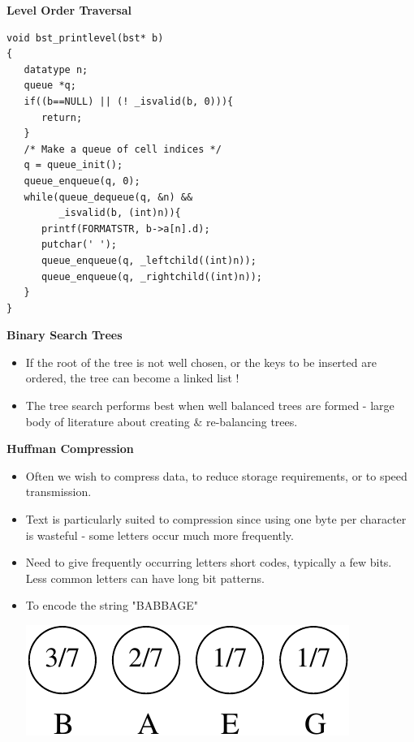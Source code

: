 {\newpage	
{\samepage	
\begin{center}	
{\Large{\bf Level Order Traversal}}	
\end{center}	
\begin{verbatim}	
void bst_printlevel(bst* b)	
{	
   datatype n;	
   queue *q;	
   if((b==NULL) || (! _isvalid(b, 0))){	
      return;	
   }	
   /* Make a queue of cell indices */	
   q = queue_init();	
   queue_enqueue(q, 0);	
   while(queue_dequeue(q, &n) &&	
         _isvalid(b, (int)n)){	
      printf(FORMATSTR, b->a[n].d);	
      putchar(' ');	
      queue_enqueue(q, _leftchild((int)n));	
      queue_enqueue(q, _rightchild((int)n));	
   }	
}	
\end{verbatim}	
}	

\newpage	
{\samepage	
\begin{center}	
{\Large{\bf Binary Search Trees}}	
\end{center}	
\begin{itemize}	
\item  If the root of the tree is not well chosen, or the keys to be inserted are ordered, the tree can become a linked list !	
\item The tree search performs best when well balanced trees are formed - large	
body of literature about creating \& re-balancing trees.	
\end{itemize}	
}	






\newpage	
{\samepage	
\begin{center}	
{\Large{\bf Huffman Compression}}	
\end{center}	
\begin{itemize}	
\item Often we wish to compress data, to reduce storage requirements, or to speed transmission.	
\item  Text is particularly suited to compression since using one byte per character is wasteful - some letters occur much more frequently.	
\item  Need to give frequently occurring letters short codes, typically a few bits. Less common letters can have long bit patterns.	
\item To encode the string "BABBAGE"	
\begin{center}	
\includegraphics{../Images/huff1.pdf}	
\end{center}	
\end{itemize}	
}	

}

